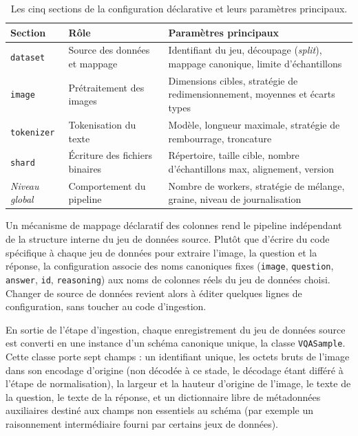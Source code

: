 \documentclass[12pt,a4paper]{report}
\begin{document}
\begin{table}[htbp]
  \centering
  \renewcommand{\arraystretch}{1.5}
  \begin{tabular}{|p{2.5cm}|p{5cm}|p{6.5cm}|}
    \hline
    \textbf{Section} & \textbf{Rôle} & \textbf{Paramètres principaux} \\
    \hline
    \texttt{dataset} & Source des données et mappage & Identifiant du jeu, découpage (\textit{split}), mappage canonique, limite d'échantillons \\
    \hline
    \texttt{image} & Prétraitement des images & Dimensions cibles, stratégie de redimensionnement, moyennes et écarts types \\
    \hline
    \texttt{tokenizer} & Tokenisation du texte & Modèle, longueur maximale, stratégie de rembourrage, troncature \\
    \hline
    \texttt{shard} & Écriture des fichiers binaires & Répertoire, taille cible, nombre d'échantillons max, alignement, version \\
    \hline
    \textit{Niveau global} & Comportement du pipeline & Nombre de workers, stratégie de mélange, graine, niveau de journalisation \\
    \hline
  \end{tabular}
  \vspace{0.2cm}
  \caption{Les cinq sections de la configuration déclarative et leurs paramètres principaux.}
  \label{tab:config_sections}
\end{table}

Un mécanisme de mappage déclaratif des colonnes rend le pipeline indépendant de la structure interne du jeu de données source. Plutôt que d'écrire du code spécifique à chaque jeu de données pour extraire l'image, la question et la réponse, la configuration associe des noms canoniques fixes (\texttt{image}, \texttt{question}, \texttt{answer}, \texttt{id}, \texttt{reasoning}) aux noms de colonnes réels du jeu de données choisi. Changer de source de données revient alors à éditer quelques lignes de configuration, sans toucher au code d'ingestion.

En sortie de l'étape d'ingestion, chaque enregistrement du jeu de données source est converti en une instance d'un schéma canonique unique, la classe \texttt{VQASample}. Cette classe porte sept champs : un identifiant unique, les octets bruts de l'image dans son encodage d'origine (non décodée à ce stade, le décodage étant différé à l'étape de normalisation), la largeur et la hauteur d'origine de l'image, le texte de la question, le texte de la réponse, et un dictionnaire libre de métadonnées auxiliaires destiné aux champs non essentiels au schéma (par exemple un raisonnement intermédiaire fourni par certains jeux de données).
\end{document}

